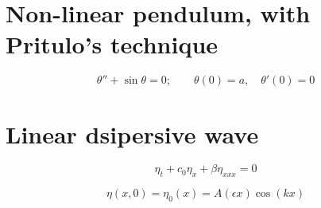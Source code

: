 \documentclass[11pt,letter, swedish, english
]{article}
\begin{document}
\section{Non-linear pendulum, with Pritulo's technique}

\begin{equation}
\theta''+\sin\theta =0;\qquad
\theta(0)=a,\quad \theta'(0)=0
\end{equation}


\section{Linear dsipersive wave}


\begin{equation}
\eta_t + c_0\eta_{x}+\beta\eta_{xxx}=0
\end{equation}

\begin{equation}
\eta(x, 0)=\eta_0(x)=A(\epsilon x)\cos(kx)
\end{equation}
\end{document}
